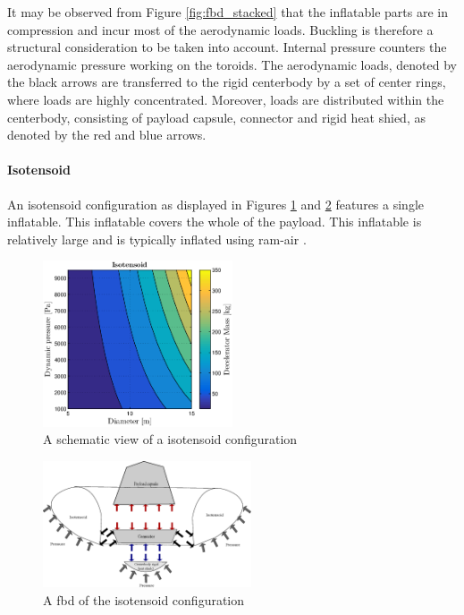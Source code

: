 It may be observed from Figure  \ref{fig:fbd_stacked} that the inflatable parts are in compression and incur most of the aerodynamic loads. Buckling is therefore a structural consideration to be taken into account. Internal pressure counters the aerodynamic pressure working on the toroids. The aerodynamic loads, denoted by the black arrows are transferred to the rigid centerbody by a set of center rings, where loads are highly concentrated. Moreover, loads are distributed within the centerbody, consisting of payload capsule, connector and rigid heat shied, as denoted by the red and blue arrows.


\paragraph{Isotensoid}

An isotensoid configuration as displayed in Figures \ref{fig:conc_iso} and \ref{fig:fbd_iso} features a single inflatable. This inflatable covers the whole of the payload. This inflatable is relatively large and is typically inflated using ram-air \cite{Smith2011}. 

\begin{figure}[H]
\centering
\includegraphics[width = 0.5\textwidth]{Figure/ISO_comp.eps}
\caption{A schematic view of a isotensoid configuration}
\label{fig:conc_iso}
\end{figure}

\begin{figure}[H]
\centering
\includegraphics[width = 0.55\textwidth]{Figure/FBD_isotensoid.eps}
\caption{A \gls{fbd} of the isotensoid configuration}
\label{fig:fbd_iso}
\end{figure}

